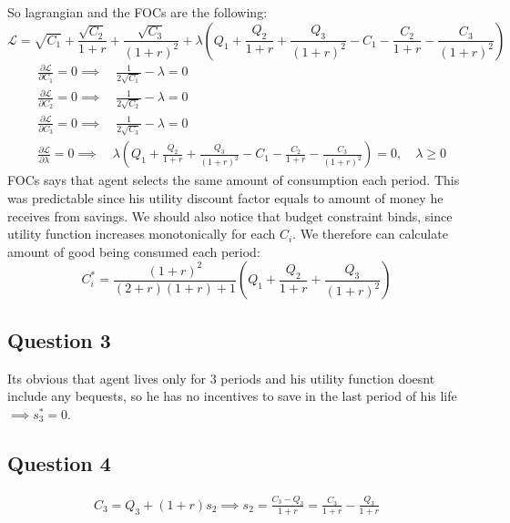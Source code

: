 \documentclass[11pt, oneside]{article}
\begin{document}
\begin{enumerate}[(1)]
So lagrangian and the FOCs are the following:
\[
\mathcal{L} = \sqrt{C_{1}} + \frac{\sqrt{C_{2}}}{1+r} + \frac{\sqrt{C_{3}}}{(1+r)^{2}} + \lambda \left( Q_{1} + \frac{Q_{2}}{1+r} + \frac{Q_{3}}{(1+r)^{2}} - C_{1} - \frac{C_{2}}{1+r} -\frac{C_{3}}{(1+r)^{2}} \right)
\]
\begin{align*}
&\frac{\partial \mathcal{L}}{\partial C_{1}} = 0 \implies \quad \frac{1}{2\sqrt{C_{1}}} - \lambda = 0\\
&\frac{\partial \mathcal{L}}{\partial C_{2}} = 0 \implies \quad \frac{1}{2\sqrt{C_{2}}} - \lambda = 0 \\
&\frac{\partial \mathcal{L}}{\partial C_{3}} = 0 \implies \quad \frac{1}{2\sqrt{C_{3}}} - \lambda = 0 \\
&\frac{\partial \mathcal{L}}{\partial \lambda} = 0 \implies \quad \lambda \left( Q_{1} + \frac{Q_{2}}{1+r} + \frac{Q_{3}}{(1+r)^{2}} - C_{1} - \frac{C_{2}}{1+r} -\frac{C_{3}}{(1+r)^{2}} \right) = 0, \quad \lambda \ge 0
\end{align*}
FOCs says that agent selects the same amount of consumption each period. This was predictable since his utility discount factor equals to amount of money he receives from savings. We should also notice that budget constraint binds, since utility function increases monotonically for each $ C_{i} $. We therefore can calculate amount of good being consumed each period:
\[
C_{i}^{*} = \frac{(1 +r)^{2}}{(2+r)(1+r) + 1} \left( Q_{1}  + \frac{Q_{2}}{1+r} + \frac{Q_{3}}{(1+r)^{2}} \right)
\]
\end{enumerate}
\subsection*{Question 3}

Its obvious that agent lives only for 3 periods and his utility function doesnt include any bequests, so he has no incentives to save in the last period of his life $ \implies s^{*}_{3} = 0$. 

\subsection*{Question 4}
\begin{gather*}
C_{3}  = Q_{3} + (1+r)s_{2} \implies s_{2} = \frac{C_{3} - Q_{3}}{1 + r} = \frac{C_3}{1 + r} - \frac{Q_{3}}{1 + r} 
\end{gather*}
\end{document}
